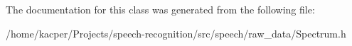 The documentation for this class was generated from the following file\+:\begin{DoxyCompactItemize}
\item 
/home/kacper/\+Projects/speech-\/recognition/src/speech/raw\+\_\+data/Spectrum.\+h\end{DoxyCompactItemize}
